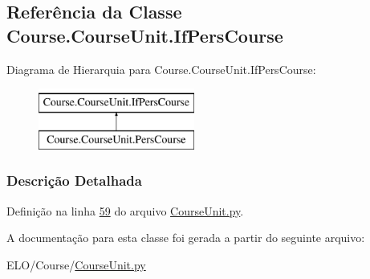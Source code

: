 \hypertarget{classCourse_1_1CourseUnit_1_1IfPersCourse}{\subsection{Referência da Classe Course.\-Course\-Unit.\-If\-Pers\-Course}
\label{classCourse_1_1CourseUnit_1_1IfPersCourse}
}
Diagrama de Hierarquia para Course.\-Course\-Unit.\-If\-Pers\-Course\-:\begin{figure}[H]
\begin{center}
\leavevmode
\includegraphics[height=2.000000cm]{d0/d62/classCourse_1_1CourseUnit_1_1IfPersCourse}
\end{center}
\end{figure}


\subsubsection{Descrição Detalhada}


Definição na linha \hyperlink{CourseUnit_8py_source_l00059}{59} do arquivo \hyperlink{CourseUnit_8py_source}{Course\-Unit.\-py}.



A documentação para esta classe foi gerada a partir do seguinte arquivo\-:\begin{DoxyCompactItemize}
\item 
E\-L\-O/\-Course/\hyperlink{CourseUnit_8py}{Course\-Unit.\-py}\end{DoxyCompactItemize}
